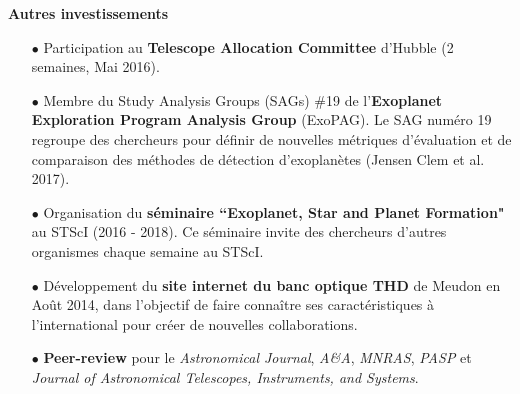 \documentclass[11pt,a4paper, french]{article}
\begin{document}
\textbf{Autres investissements}\\
\vspace{-0.1cm}
\begin{itemize} \itemsep 5pt
    \item[$\bullet$] \small Participation au {\bf Telescope Allocation Committee} d'Hubble (2 semaines, Mai 2016).
    \item[$\bullet$] \small Membre du Study Analysis Groups (SAGs) \#19 de l'\textbf{Exoplanet Exploration Program Analysis Group} (ExoPAG). Le SAG numéro 19 regroupe des chercheurs pour définir de nouvelles métriques d'évaluation et de comparaison des méthodes de détection d'exoplanètes (Jensen Clem et al. 2017).
    \item[$\bullet$] \small Organisation du \textbf{séminaire ``Exoplanet, Star and Planet Formation"} au STScI (2016 - 2018). Ce séminaire invite des chercheurs d'autres organismes chaque semaine au STScI.
    \item[$\bullet$] \small Développement du \textbf{site internet du banc optique THD} de Meudon en Août 2014, dans l'objectif de faire connaître ses caractéristiques à l'international pour créer de nouvelles collaborations.
    \item[$\bullet$] \small \textbf{Peer-review} pour le \textit{Astronomical Journal}, \textit{A\&A}, \textit{MNRAS}, \textit{PASP} et \textit{Journal of Astronomical Telescopes, Instruments, and Systems}.
\end{itemize}


\end{document}
